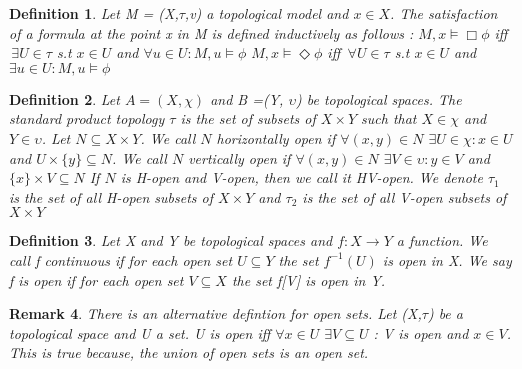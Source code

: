 \documentclass[12pt, a4paper]{scrartcl}
\newtheorem{definition}{Definition}[subsection]
\newtheorem{remark}[definition]{Remark}
\begin{document}
\begin{definition}
    Let M = (X,$\tau$,v) a topological model and $x \in X$. The satisfaction of a formula
    at the point x in M is defined inductively as follows :
    \newline
    $M,x \models \Box \phi$ iff $\, \exists U \in \tau$ s.t $x \in U$ and $\forall u \in U : M,u \models \phi$
    \newline
    $M,x \models \Diamond \phi$ iff $\, \forall U \in \tau$ s.t $x \in U$ and $\exists u \in U : M,u \models \phi$
        
\end{definition}

\begin{definition}
    Let $A = (X, \chi)$ and B =(Y, $\upsilon$) be topological spaces. The standard product topology $\tau$ is the set of subsets of 
    $X \times Y$ such that $X \in \chi$ and $Y \in \upsilon$. \newline
    Let $N \subseteq X \times Y $. We call $N$ horizontally open if $\forall (x,y) \in N $ $\exists U \in \chi : x \in U $ and $ U \times \{ y \} \subseteq N$. \newline We call $N$ 
    vertically open if $\forall (x,y) \in N$ $\exists V \in \upsilon : y \in V$ and  $ \{ x \} \times V \subseteq N$ \newline
    If $N$ is H-open and V-open, then we call it HV-open. \newline
    We denote $\tau_1$ is the set of all H-open subsets of $X \times Y$ and $\tau_2$ is the set of all V-open subsets of $X\times Y$
        
\end{definition}


\begin{definition}
    Let X and Y be topological spaces and $f : X \rightarrow Y$ a function.
    We call f continuous if for each open set $U \subseteq Y$ the set $f^{-1}(U)$ is open in X. We say f 
    is open if for each open set $V \subseteq X$ the set f[V] is open in Y.
        
\end{definition}

\begin{remark}
    There is an alternative defintion for open sets. Let (X,$\tau$) be a topological space and U a set.
    U is open iff $\forall x \in U$  $\exists V\subseteq U$ : V is open and $x \in V$. This is true because,
    the union of open sets is an open set.
    \newline
    
    
\end{remark}
    
\end{document}
